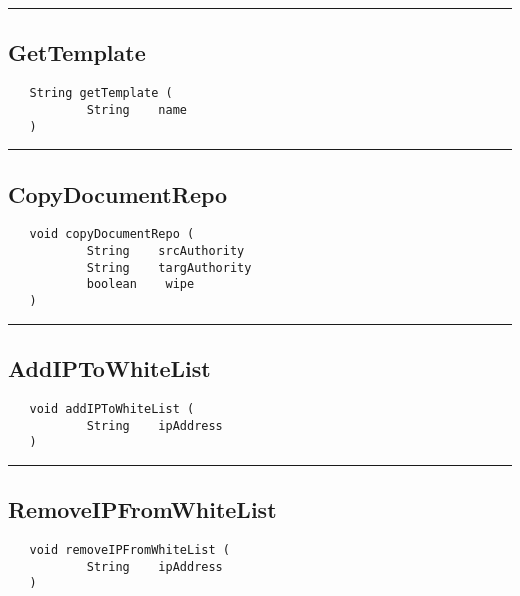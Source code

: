 \rule{15cm}{2pt}
\subsection{GetTemplate}
\label{Api:GetTemplate}
\begin{verbatim}
   String getTemplate (
           String    name
   )
\end{verbatim}



\rule{15cm}{2pt}
\subsection{CopyDocumentRepo}
\label{Api:CopyDocumentRepo}
\begin{verbatim}
   void copyDocumentRepo (
           String    srcAuthority
           String    targAuthority
           boolean    wipe
   )
\end{verbatim}



\rule{15cm}{2pt}
\subsection{AddIPToWhiteList}
\label{Api:AddIPToWhiteList}
\begin{verbatim}
   void addIPToWhiteList (
           String    ipAddress
   )
\end{verbatim}



\rule{15cm}{2pt}
\subsection{RemoveIPFromWhiteList}
\label{Api:RemoveIPFromWhiteList}
\begin{verbatim}
   void removeIPFromWhiteList (
           String    ipAddress
   )
\end{verbatim}



